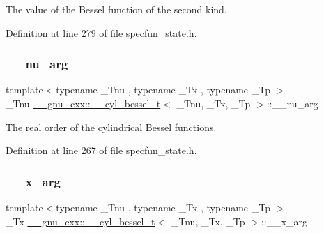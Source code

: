 The value of the Bessel function of the second kind. 



Definition at line 279 of file specfun\+\_\+state.\+h.

\mbox{\label{struct____gnu__cxx_1_1____cyl__bessel__t_a3d17d7f7196d7aef725228cf02269195}} 
\subsubsection{\texorpdfstring{\+\_\+\+\_\+nu\+\_\+arg}{\_\_nu\_arg}}
{\footnotesize\ttfamily template$<$typename \+\_\+\+Tnu , typename \+\_\+\+Tx , typename \+\_\+\+Tp $>$ \\
\+\_\+\+Tnu \hyperlink{struct____gnu__cxx_1_1____cyl__bessel__t}{\+\_\+\+\_\+gnu\+\_\+cxx\+::\+\_\+\+\_\+cyl\+\_\+bessel\+\_\+t}$<$ \+\_\+\+Tnu, \+\_\+\+Tx, \+\_\+\+Tp $>$\+::\+\_\+\+\_\+nu\+\_\+arg}



The real order of the cylindrical Bessel functions. 



Definition at line 267 of file specfun\+\_\+state.\+h.

\mbox{\label{struct____gnu__cxx_1_1____cyl__bessel__t_aac526f7bf86ebf0201e46545d9927f15}} 
\subsubsection{\texorpdfstring{\+\_\+\+\_\+x\+\_\+arg}{\_\_x\_arg}}
{\footnotesize\ttfamily template$<$typename \+\_\+\+Tnu , typename \+\_\+\+Tx , typename \+\_\+\+Tp $>$ \\
\+\_\+\+Tx \hyperlink{struct____gnu__cxx_1_1____cyl__bessel__t}{\+\_\+\+\_\+gnu\+\_\+cxx\+::\+\_\+\+\_\+cyl\+\_\+bessel\+\_\+t}$<$ \+\_\+\+Tnu, \+\_\+\+Tx, \+\_\+\+Tp $>$\+::\+\_\+\+\_\+x\+\_\+arg}




